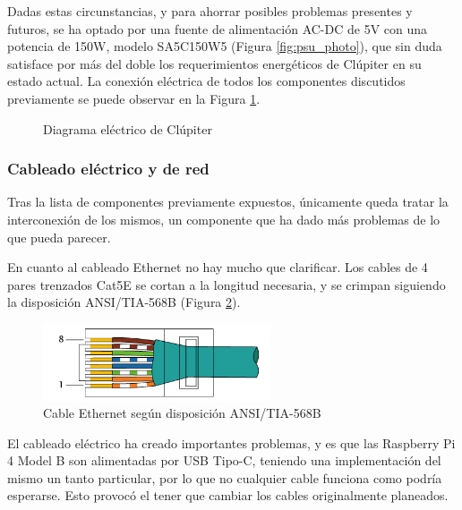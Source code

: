 Dadas estas circunstancias, y para ahorrar posibles problemas presentes y futuros, se ha optado por una fuente de alimentación AC-DC de 5V con una potencia de 150W, modelo SA5C150W5 (Figura \ref{fig:psu_photo}), que sin duda satisface por más del doble los requerimientos energéticos de Clúpiter en su estado actual. La conexión eléctrica de todos los componentes discutidos previamente se puede observar en la Figura \ref{fig:raspi_electric_diagram}.

\begin{figure}[h!]
  \centering
  \vspace*{0.5cm}
  \def\svgwidth{0.9\textwidth}
  
  \caption{Diagrama eléctrico de Clúpiter}
  \label{fig:raspi_electric_diagram}
\end{figure}

\subsubsection{Cableado eléctrico y de red}
\label{sssec:cableado_electrico_red}
Tras la lista de componentes previamente expuestos, únicamente queda tratar la interconexión de los mismos, un componente que ha dado más problemas de lo que pueda parecer.

En cuanto al cableado Ethernet no hay mucho que clarificar. Los cables de 4 pares trenzados Cat5E se cortan a la longitud necesaria, y se crimpan siguiendo la disposición ANSI/TIA-568B (Figura \ref{fig:TIA-568B-horiz}).

\begin{figure}[h!]
  \centering
  \includegraphics[width=0.6\textwidth]{img/TIA-568B-horizontal.png}
  \caption{Cable Ethernet según disposición ANSI/TIA-568B}
  \label{fig:TIA-568B-horiz}
\end{figure}

El cableado eléctrico ha creado importantes problemas, y es que las Raspberry Pi 4 Model B son alimentadas por USB Tipo-C, teniendo una implementación del mismo un tanto particular, por lo que no cualquier cable funciona como podría esperarse. Esto provocó el tener que cambiar los cables originalmente planeados.

